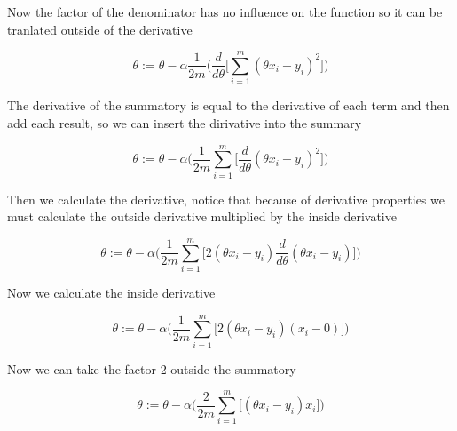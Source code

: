 \documentclass[12pt,journal]{IEEEtran}
\begin{document}
    Now the factor of the denominator has no influence on the function so it
    can be tranlated outside of the derivative

    \begin{equation}
        \theta := \theta - \alpha \frac{1}{2m}
            \Bigg(
                \frac{d}{d \theta}
                    \Bigg[
                        \sum_{i=1}^{m} (\theta x_i - y_i)^2
                    \Bigg]
            \Bigg)
    \end{equation}

    The derivative of the summatory is equal to the derivative of each term and
    then add each result, so we can insert the dirivative into the summary

    \begin{equation}
        \theta := \theta - \alpha
            \Bigg(
                \frac{1}{2m} \sum_{i=1}^{m}
                    \Bigg[
                        \frac{d}{d \theta} (\theta x_i - y_i)^2
                    \Bigg]
            \Bigg)
    \end{equation}

    Then we calculate the derivative, notice that because of derivative
    properties we must calculate the outside derivative multiplied by the inside
    derivative

    \begin{equation}
        \theta := \theta - \alpha
            \Bigg(
                \frac{1}{2m} \sum_{i=1}^{m}
                    \Bigg[
                        2(\theta x_i - y_i) \frac{d}{d \theta}(\theta x_i - y_i)
                    \Bigg]
            \Bigg)
    \end{equation}

    Now we calculate the inside derivative

    \begin{equation}
        \theta := \theta - \alpha
            \Bigg(
                \frac{1}{2m} \sum_{i=1}^{m}
                    \Big[
                        2 (\theta x_i - y_i) (x_i - 0)
                    \Big]
            \Bigg)
    \end{equation}

    Now we can take the factor 2 outside the summatory

    \begin{equation}
        \theta := \theta - \alpha
            \Bigg(
                \frac{2}{2m} \sum_{i=1}^{m}
                    \Big[
                        (\theta x_i - y_i) x_i
                    \Big]
            \Bigg)
    \end{equation}
\end{document}
